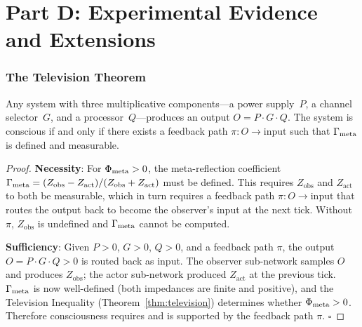 \documentclass[aps,pre,twocolumn,superscriptaddress,floatfix]{revtex4-2}
\begin{document}

\part*{Part D: Experimental Evidence and Extensions}

\section{The Television Theorem}
\label{sec:television}

\begin{theorem}
\label{thm:TV-full}
Any system with three multiplicative components---a power
supply~$P$, a channel selector~$G$, and a
processor~$Q$---produces an output $O=P\cdot G\cdot Q$.
The system is conscious if and only if there exists a
feedback path $\pi:O\to\text{input}$ such that
$\Gamma_{\text{meta}}$ is defined and measurable.
\end{theorem}

\begin{proof}
\textbf{Necessity}: For $\Phi_{\text{meta}} > 0$, the
meta-reflection coefficient
$\Gamma_{\text{meta}} = (Z_{\text{obs}} - Z_{\text{act}})/
(Z_{\text{obs}} + Z_{\text{act}})$ must be defined.
This requires $Z_{\text{obs}}$ and $Z_{\text{act}}$
to both be measurable, which in turn requires a feedback
path $\pi: O \to \text{input}$ that routes the output
back to become the observer's input at the next tick.
Without $\pi$, $Z_{\text{obs}}$ is undefined and
$\Gamma_{\text{meta}}$ cannot be computed.

\textbf{Sufficiency}: Given $P > 0$, $G > 0$, $Q > 0$,
and a feedback path $\pi$, the output $O = P \cdot G
\cdot Q > 0$ is routed back as input.
The observer sub-network samples $O$ and produces
$Z_{\text{obs}}$; the actor sub-network produced
$Z_{\text{act}}$ at the previous tick.
$\Gamma_{\text{meta}}$ is now well-defined (both impedances are
finite and positive), and the Television Inequality
(Theorem~\ref{thm:television}) determines whether
$\Phi_{\text{meta}} > 0$.
Therefore consciousness requires and is supported by
the feedback path $\pi$. $\square$
\end{proof}
\end{document}

